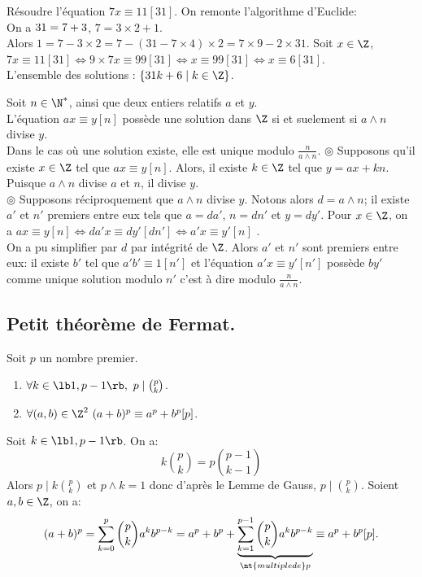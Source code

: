 \documentclass[11pt]{article}
\begin{document}
\begin{ex}{}{}
    Résoudre l'équation $7x\equiv11[31]$.
    \tcblower
    On remonte l'algorithme d'Euclide:\\
    On a $31=7\time4+3$, $7=3\times2+1$.\\
    Alors $1=7-3\times2=7-(31-7\times4)\times2=7\times9 - 2\times31$.\n
    Soit $x\in\Z$, $7x\equiv11[31]\iff9\times7x\equiv99[31]\iff x\equiv 99[31]\iff x\equiv 6[31]$.\\
    L'ensemble des solutions : $\{31k+6\mid k\in\Z\}$.
\end{ex}

\begin{corr}{}{}
    Soit $n\in\N^*$, ainsi que deux entiers relatifs $a$ et $y$.\\
    L'équation $ax\equiv y[n]$ possède une solution dans $\Z$ si et suelement si $a\land n$ divise $y$.\\
    Dans le cas où une solution existe, elle est unique modulo $\frac{n}{a\land n}$.
    \tcblower
    $\circledcirc$ Supposons qu'il existe $x\in\Z$ tel que $ax\equiv y[n]$. Alors, il existe $k\in\Z$ tel que $y=ax+kn$.\\
    Puisque $a\land n$ divise $a$ et $n$, il divise $y$.\\
    $\circledcirc$ Supposons réciproquement que $a\land n$ divise $y$. Notons alors $d=a\land n$; il existe $a'$ et $n'$ premiers entre eux tels que $a=da'$, $n=dn'$ et $y=dy'$. Pour $x\in\Z$, on a $ax\equiv y[n]\iff da'x\equiv dy'[dn']\iff a'x\equiv y'[n]$ .\\
    On a pu simplifier par $d$ par intégrité de $\Z$. Alors $a'$ et $n'$ sont premiers entre eux: il existe $b'$ tel que $a'b'\equiv1[n']$ et l'équation $a'x\equiv y'[n']$ possède $by'$ comme unique solution modulo $n'$ c'est à dire modulo $\frac{n}{a\land n}$.
\end{corr}

\subsection{Petit théorème de Fermat.}

\begin{prop}{}{}
    Soit $p$ un nombre premier.
    \begin{enumerate}[topsep=0pt,itemsep=-0.9 ex]
        \item $\forall k\in\lb1,p-1\rb,~ p\mid\binom{p}{k}$.
        \item $\forall (a,b)\in\Z^2~(a+b)^p\equiv a^p+b^p[p]$.
    \end{enumerate}
    \tcblower
     Soit $k\in\lb1,p-1\rb$. On a:
    \begin{equation*}
        k\binom{p}{k}=p\binom{p-1}{k-1}
    \end{equation*}
    Alors $p\mid k\binom{p}{k}$ et $p\land k=1$ donc d'après le Lemme de Gauss, $p\mid\binom{p}{k}$.\n
     Soient $a,b\in\Z$, on a:
    \begin{equation*}
        (a+b)^p=\sum_{k=0}^p\binom{p}{k}a^kb^{p-k}=a^p+b^p+\underbrace{\sum_{k=1}^{p-1}\binom{p}{k}a^kb^{p-k}}_{\nt{multiple de }p}\equiv a^p+b^p[p].
    \end{equation*}
\end{prop}
\end{document}
